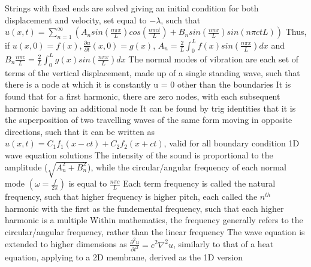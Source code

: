 \documentclass[11 pt, twoside]{article}
\newenvironment{outline*}
{
	\begin{outline}[enumerate]
	}
	{\end{outline}
}
\newcommand\pd[2]{\frac{\partial #1}{\partial #2}}
\begin{document}
\begin{outline*}
\1 Strings with fixed ends are solved giving an initial condition for both displacement and velocity, set equal to $-\lambda$, such that $u(x, t) = \sum^{\infty}_{n = 1}(A_nsin(\frac{n\pi x}{L})cos(\frac{n\pi ct}{L}) + B_nsin(\frac{n\pi x}{L})sin({n \pi ct}{L}))$
	\2 Thus, if $u(x, 0) = f(x), \frac{\partial u}{\partial t}(x, 0) = g(x)$, $A_n = \frac{2}{L}\int^L_0 f(x)sin(\frac{n\pi x}{L})dx$ and $B_n\frac{n\pi c}{L} = \frac{2}{L}\int^L_0 g(x)sin(\frac{n\pi x}{L})dx$
	\2 The normal modes of vibration are each set of terms of the vertical displacement, made up of a single standing wave, such that there is a node at which it is constantly u = 0 other than the boundaries
		\3 It is found that for a first harmonic, there are zero nodes, with each subsequent harmonic having an additional node
		\3 It can be found by trig identities that it is the superposition of two travelling waves of the same form moving in opposite directions, such that it can be written as $u(x, t) = C_1f_1(x - ct) + C_2f_2(x + ct)$, valid for all boundary condition 1D wave equation solutions
	\2 The intensity of the sound is proportional to the amplitude ($\sqrt{A_n^2 + B_n^2}$), while the circular/angular frequency of each normal mode $(\omega = \frac{f}{2\pi})$ is equal to $\frac{n\pi c}{L}$
		\3 Each term frequency is called the natural frequency, such that higher frequency is higher pitch, each called the $n^{th}$ harmonic with the first as the fundemental frequency, such that each higher harmonic is a multiple
		\3 Within mathematics, the frequency generally refers to the circular/angular frequency, rather than the linear frequency
\1 The wave equation is extended to higher dimensions as $\pd{^2u}{t^2} = c^2\nabla^2u$, similarly to that of a heat equation, applying to a 2D membrane, derived as the 1D version
\end{outline*}
\end{document}
